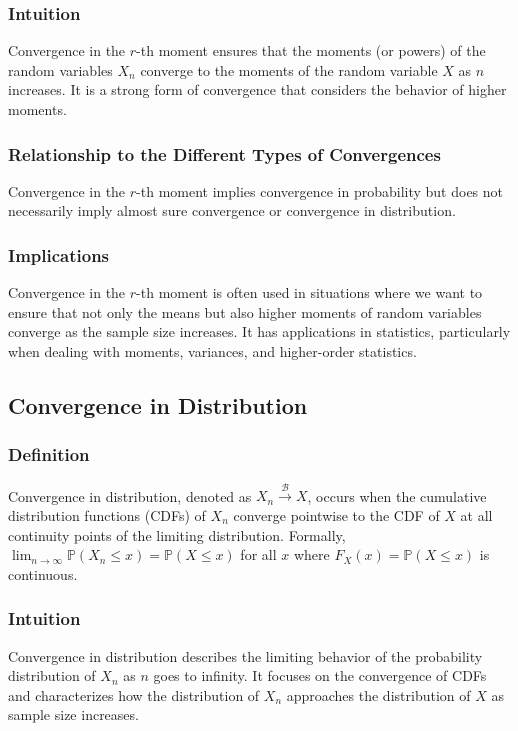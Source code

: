 \documentclass{article}
\begin{document}
\subsubsection{ Intuition}
Convergence in the \(r\)-th moment ensures that the moments (or powers) of the random variables \(X_n\) converge to the moments of the random variable \(X\) as \(n\) increases. It is a strong form of convergence that considers the behavior of higher moments.

\subsubsection{ Relationship to the Different Types of Convergences}
Convergence in the \(r\)-th moment implies convergence in probability but does not necessarily imply almost sure convergence or convergence in distribution.

\subsubsection{ Implications}
Convergence in the \(r\)-th moment is often used in situations where we want to ensure that not only the means but also higher moments of random variables converge as the sample size increases. It has applications in statistics, particularly when dealing with moments, variances, and higher-order statistics.

\subsection{ Convergence in Distribution}

\subsubsection{ Definition}
Convergence in distribution, denoted as \(X_n \xrightarrow{\mathcal{B}} X\), occurs when the cumulative distribution functions (CDFs) of \(X_n\) converge pointwise to the CDF of \(X\) at all continuity points of the limiting distribution. Formally, \(\lim_{n \to \infty} \mathbb{P}(X_n \leq x) = \mathbb{P}(X \leq x)\) for all \(x\) where \(F_X(x) = \mathbb{P}(X \leq x)\) is continuous.

\subsubsection{ Intuition}
Convergence in distribution describes the limiting behavior of the probability distribution of \(X_n\) as \(n\) goes to infinity. It focuses on the convergence of CDFs and characterizes how the distribution of \(X_n\) approaches the distribution of \(X\) as sample size increases.
\end{document}
